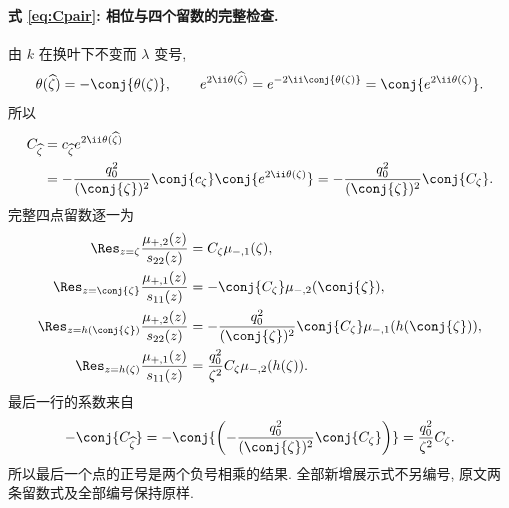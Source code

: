 \paragraph{式 \eqref{eq:Cpair}: 相位与四个留数的完整检查.}
由 $k$ 在换叶下不变而 $\lambda$ 变号,
\[
\theta(\widehat\zeta)=-\conj{\theta(\zeta)},
\qquad
e^{2\ii\theta(\widehat\zeta)}
=e^{-2\ii\conj{\theta(\zeta)}}
=\conj{e^{2\ii\theta(\zeta)}}.
\]
所以
\begin{align*}
C_{\widehat\zeta}
&=c_{\widehat\zeta}e^{2\ii\theta(\widehat\zeta)}\\
&=-\dfrac{q_0^2}{(\conj{\zeta})^2}\conj{c_\zeta}
\conj{e^{2\ii\theta(\zeta)}}
=-\dfrac{q_0^2}{(\conj{\zeta})^2}\conj{C_\zeta}.
\end{align*}
完整四点留数逐一为
\begin{align*}
\Res_{z=\zeta}\dfrac{\mu_{+,2}(z)}{s_{22}(z)}
&=C_\zeta\mu_{-,1}(\zeta),\\
\Res_{z=\conj{\zeta}}\dfrac{\mu_{+,1}(z)}{s_{11}(z)}
&=-\conj{C_\zeta}\mu_{-,2}(\conj{\zeta}),\\
\Res_{z=h(\conj{\zeta})}\dfrac{\mu_{+,2}(z)}{s_{22}(z)}
&=-\dfrac{q_0^2}{(\conj{\zeta})^2}\conj{C_\zeta}
\mu_{-,1}(h(\conj{\zeta})),\\
\Res_{z=h(\zeta)}\dfrac{\mu_{+,1}(z)}{s_{11}(z)}
&=\dfrac{q_0^2}{\zeta^2}C_\zeta\mu_{-,2}(h(\zeta)).
\end{align*}
最后一行的系数来自
\[
-\conj{C_{\widehat\zeta}}
=-\conj{\left(-\dfrac{q_0^2}{(\conj{\zeta})^2}\conj{C_\zeta}\right)}
=\dfrac{q_0^2}{\zeta^2}C_\zeta.
\]
所以最后一个点的正号是两个负号相乘的结果.
全部新增展示式不另编号, 原文两条留数式及全部编号保持原样.

